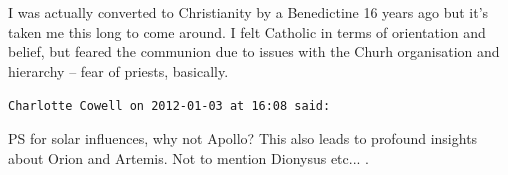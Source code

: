 \begin{footnotesize}
\begin{sffamily}
I was actually converted to Christianity by a Benedictine 16 years ago but it's taken me this long to come around. I felt Catholic in terms of orientation and belief, but feared the communion due to issues with the Churh organisation and hierarchy -- fear of priests, basically.

\hfill

\texttt{Charlotte Cowell on 2012-01-03 at 16:08 said:}

PS for solar influences, why not Apollo? This also leads to profound insights about Orion and Artemis. Not to mention Dionysus etc... .


\hfill

\end{sffamily}
\end{footnotesize}

